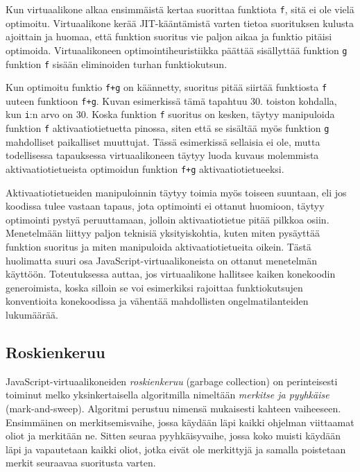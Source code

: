 Kun virtuaalikone alkaa ensimmäistä kertaa suorittaa funktiota \texttt{f}, sitä ei ole vielä optimoitu. Virtuaalikone kerää JIT-kääntämistä varten tietoa suorituksen kulusta ajoittain ja huomaa, että funktion suoritus vie paljon aikaa ja funktio pitäisi optimoida. Virtuaalikoneen optimointiheuristiikka päättää sisällyttää funktion \texttt{g} funktion \texttt{f} sisään eliminoiden turhan funktiokutsun.

Kun optimoitu funktio \texttt{f+g} on käännetty, suoritus pitää siirtää funktiosta \texttt{f} uuteen funktioon \texttt{f+g}. Kuvan esimerkissä tämä tapahtuu 30. toiston kohdalla, kun \texttt{i}:n arvo on 30. Koska funktion \texttt{f} suoritus on kesken, täytyy manipuloida funktion \texttt{f} aktivaatiotietuetta pinossa, siten että se sisältää myös funktion \texttt{g} mahdolliset paikalliset muuttujat. Tässä esimerkissä sellaisia ei ole, mutta todellisessa tapauksessa virtuaalikoneen täytyy luoda kuvaus molemmista aktivaatiotietueista optimoidun funktion \texttt{f+g} aktivaatiotietueeksi.

Aktivaatiotietueiden manipuloinnin täytyy toimia myös toiseen suuntaan, eli jos koodissa tulee vastaan tapaus, jota optimointi ei ottanut huomioon, täytyy optimointi pystyä peruuttamaan, jolloin aktivaatiotietue pitää pilkkoa osiin. Menetelmään liittyy paljon teknisiä yksityiskohtia, kuten miten pysäyttää funktion suoritus ja miten manipuloida aktivaatiotietueita oikein. Tästä huolimatta suuri osa JavaScript-virtuaalikoneista on ottanut menetelmän käyttöön. Toteutuksessa auttaa, jos virtuaalikone hallitsee kaiken konekoodin generoimista, koska silloin se voi esimerkiksi rajoittaa funktiokutsujen konventioita konekoodissa ja vähentää mahdollisten ongelmatilanteiden lukumäärää.

\subsection{Roskienkeruu}

JavaScript-virtuaalikoneiden \textit{roskienkeruu} (garbage collection) on perinteisesti toiminut melko yksinkertaisella algoritmilla nimeltään \textit{merkitse ja pyyhkäise} (mark-and-sweep). Algoritmi perustuu nimensä mukaisesti kahteen vaiheeseen. Ensimmäinen on merkitsemisvaihe, jossa käydään läpi kaikki ohjelman viittaamat oliot ja merkitään ne. Sitten seuraa pyyhkäisyvaihe, jossa koko muisti käydään läpi ja vapautetaan kaikki oliot, jotka eivät ole merkittyjä ja samalla poistetaan merkit seuraavaa suoritusta varten.


